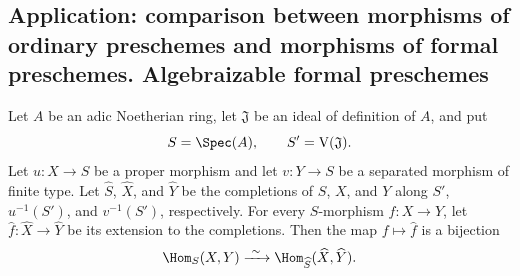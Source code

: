 \subsection{Application: comparison between morphisms of ordinary preschemes and morphisms of formal preschemes. Algebraizable formal preschemes}
\label{subsection:III.5.4}

\begin{theorem}[5.4.1]
\label{III.5.4.1}
Let $A$ be an adic Noetherian ring, let $\mathfrak{J}$ be an ideal
of definition of $A$, and put
\[
  S=\Spec(A),\qquad S'=\mathrm{V}(\mathfrak{J}).
\]
Let $u:X\to S$ be a proper morphism and let $v:Y\to S$ be a
separated morphism of finite type.  Let
$\widehat{S}$, $\widehat{X}$, and $\widehat{Y}$ be the completions
of $S$, $X$, and $Y$ along $S'$, $u^{-1}(S')$, and $v^{-1}(S')$,
respectively.  For every $S$-morphism $f:X\to Y$, let
$\widehat{f}:\widehat{X}\to\widehat{Y}$ be its extension to the
completions.  Then the map $f\mapsto\widehat{f}$ is a bijection
\[
  \Hom_S(X,Y)
  \xrightarrow{\ \sim\ }
  \Hom_{\widehat{S}}(\widehat{X},\widehat{Y}).
\]
\end{theorem}

